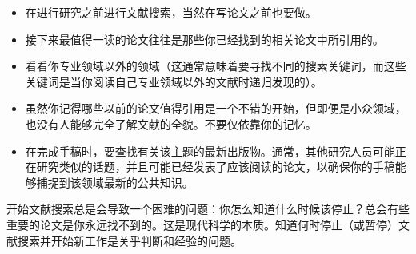 \begin{itemize}
\item 在进行研究之前进行文献搜索，当然在写论文之前也要做。
\item 接下来最值得一读的论文往往是那些你已经找到的相关论文中所引用的。
\item 看看你专业领域以外的领域（这通常意味着要寻找不同的搜索关键词，而这些关键词是当你阅读自己专业领域以外的文献时递归发现的）。
\item 虽然你记得哪些以前的论文值得引用是一个不错的开始，但即便是小众领域，也没有人能够完全了解文献的全貌。不要仅依靠你的记忆。
\item 在完成手稿时，要查找有关该主题的最新出版物。通常，其他研究人员可能正在研究类似的话题，并且可能已经发表了应该阅读的论文，以确保你的手稿能够捕捉到该领域最新的公共知识。
\end{itemize}

开始文献搜索总是会导致一个困难的问题：你怎么知道什么时候该停止？总会有些重要的论文是你永远找不到的。这是现代科学的本质。知道何时停止（或暂停）文献搜索并开始新工作是关乎判断和经验的问题。

